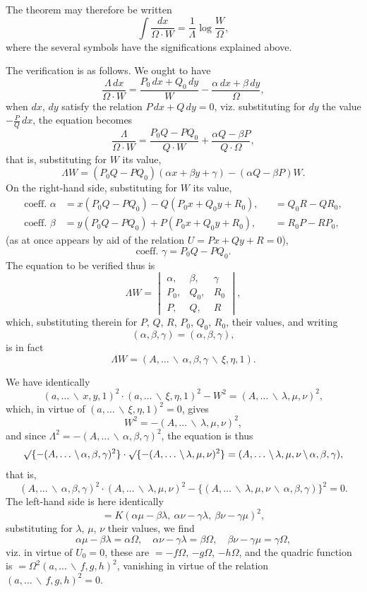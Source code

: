 \documentclass[11pt,a4paper]{book}
\begin{document}
The theorem may therefore be written
\[
\int \frac{dx}{\Omega \cdot W} = \frac{1}{\Lambda} \log \frac{W}{\Omega},
\]
where the several symbols have the significations explained above.

The verification is as follows. We ought to have
\[
\frac{\Lambda\, dx}{\Omega \cdot W} = \frac{P_0\, dx + Q_0\, dy}{W} - \frac{\alpha\, dx + \beta\, dy}{\Omega},
\]
when $dx$, $dy$ satisfy the relation $P\, dx + Q\, dy = 0$, viz. substituting for $dy$ the value $-\frac{P}{Q}\, dx$, the equation becomes
\[
\frac{\Lambda}{\Omega \cdot W} = \frac{P_0 Q - P Q_0}{Q \cdot W} + \frac{\alpha Q - \beta P}{Q \cdot \Omega},
\]
that is, substituting for $W$ its value,
\[
\Lambda W = (P_0 Q - P Q_0)(\alpha x + \beta y + \gamma) - (\alpha Q - \beta P)W.
\]
On the right-hand side, substituting for $W$ its value,
\begin{align*}
\text{coeff. } \alpha &= x(P_0 Q - P Q_0) - Q(P_0 x + Q_0 y + R_0), &&= Q_0 R - Q R_0, \\
\text{coeff. } \beta &= y(P_0 Q - P Q_0) + P(P_0 x + Q_0 y + R_0), &&= R_0 P - R P_0,
\end{align*}
(as at once appears by aid of the relation $U = Px + Qy + R = 0$),
\[
\text{coeff. } \gamma = P_0 Q - P Q_0.
\]
The equation to be verified thus is
\[
\Lambda W = \begin{vmatrix} \alpha, & \beta, & \gamma \\ P_0, & Q_0, & R_0 \\ P, & Q, & R \end{vmatrix},
\]
which, substituting therein for $P$, $Q$, $R$, $P_0$, $Q_0$, $R_0$, their values, and writing
\[
(\alpha, \beta, \gamma) = (\alpha, \beta, \gamma),
\]
is in fact
\[
\Lambda W = (A, \ldots \,\backslash\, \alpha, \beta, \gamma \,\backslash\, \xi, \eta, 1).
\]

We have identically
\[
(a, \ldots \,\backslash\, x, y, 1)^2 \cdot (a, \ldots \,\backslash\, \xi, \eta, 1)^2 - W^2 = (A, \ldots \,\backslash\, \lambda, \mu, \nu)^2,
\]
which, in virtue of $(a, \ldots \,\backslash\, \xi, \eta, 1)^2 = 0$, gives
\[
W^2 = -(A, \ldots \,\backslash\, \lambda, \mu, \nu)^2,
\]
and since $\Lambda^2 = -(A, \ldots \,\backslash\, \alpha, \beta, \gamma)^2$, the equation is thus
\[
\surd\{-(A, \ldots \,\backslash\, \alpha, \beta, \gamma)^2\} \cdot \surd\{-(A, \ldots \,\backslash\, \lambda, \mu, \nu)^2\} = (A, \ldots \,\backslash\, \lambda, \mu, \nu \,\backslash\, \alpha, \beta, \gamma),
\]
that is,
\[
(A, \ldots \,\backslash\, \alpha, \beta, \gamma)^2 \cdot (A, \ldots \,\backslash\, \lambda, \mu, \nu)^2 - \{(A, \ldots \,\backslash\, \lambda, \mu, \nu \,\backslash\, \alpha, \beta, \gamma)\}^2 = 0.
\]
The left-hand side is here identically
\[
= K(\alpha\mu - \beta\lambda,\ \alpha\nu - \gamma\lambda,\ \beta\nu - \gamma\mu)^2,
\]
substituting for $\lambda$, $\mu$, $\nu$ their values, we find
\[
\alpha\mu - \beta\lambda = \alpha\Omega, \quad \alpha\nu - \gamma\lambda = \beta\Omega, \quad \beta\nu - \gamma\mu = \gamma\Omega,
\]
viz. in virtue of $U_0 = 0$, these are $= -f\Omega$, $-g\Omega$, $-h\Omega$, and the quadric function is $= \Omega^2 (a, \ldots \,\backslash\, f, g, h)^2$, vanishing in virtue of the relation $(a, \ldots \,\backslash\, f, g, h)^2 = 0$.
\end{document}
